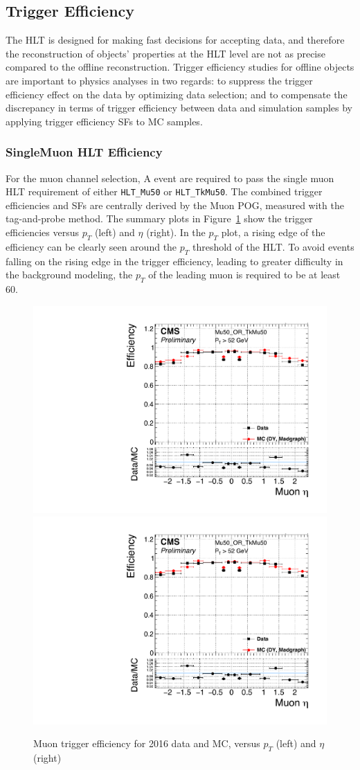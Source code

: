 \subsection{Trigger Efficiency}\label{sec:bkg_trig}
The HLT is designed for making fast decisions for accepting data, and therefore the reconstruction of objects' properties at the HLT level are not as precise compared to the offline reconstruction. Trigger efficiency studies for offline objects are important to physics analyses in two regards: to suppress the trigger efficiency effect on the data by optimizing data selection; and to compensate the discrepancy in terms of trigger efficiency between data and simulation samples by applying trigger efficiency SFs to MC samples.
\subsubsection{SingleMuon HLT Efficiency}
For the muon channel selection, A event are required to pass the single muon HLT requirement of either \texttt{HLT\_Mu50} or \texttt{HLT\_TkMu50}. The combined trigger efficiencies and SFs are centrally derived by the Muon POG, measured with the tag-and-probe method. The summary plots in Figure~\ref{fig:bg_trgeff_mu} show the trigger efficiencies versus $p_T$ (left) and $\eta$ (right). In the $p_T$ plot, a rising edge of the efficiency can be clearly seen around the $p_T$ threshold of the HLT. To avoid events falling on the rising edge in the trigger efficiency, leading to greater difficulty in the background modeling, the $p_T$ of the leading muon is required to be at least 60\GeV.

\begin{figure}[htpb]
\begin{center}
\includegraphics[width=0.49\linewidth, page=2]{figures/bg_muontrgeff.pdf}
\includegraphics[width=0.49\linewidth, page=1]{figures/bg_muontrgeff.pdf}
\caption{Muon trigger efficiency for 2016 data and MC, versus $p_T$ (left) and $\eta$ (right)}
\label{fig:bg_trgeff_mu}
\end{center}
\end{figure}

